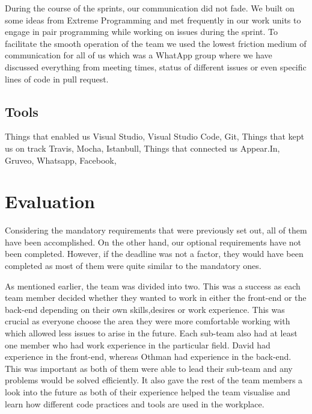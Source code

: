 \documentclass[a4paper]{article}
\begin{document}
	During the course of the sprints, our communication did not fade. We built on some ideas from Extreme Programming and met frequently in our work units to engage in pair programming while working on issues during the sprint. To facilitate the smooth operation of the team we used the lowest friction medium of communication for all of us which was a WhatApp group where we have discussed everything from meeting times, status of different issues or even specific lines of code in pull request. 
	
	\subsection{Tools}
	
	Things that enabled us
	Visual Studio, Visual Studio Code, Git,
	Things that kept us on track
	Travis, Mocha, Istanbull,
	Things that connected us
	Appear.In, Gruveo, Whatsapp, Facebook,
	
	
	\section{Evaluation}
	Considering the mandatory requirements that were previously set out, all of them have been accomplished. %
	On the other hand, our optional requirements have not been completed. However, if the deadline was not a factor, they would have been completed as most of them were quite similar to the mandatory ones. 
	
	As mentioned earlier, the team was divided into two. This was a success as each team member decided whether they wanted to work in either the front-end or the back-end depending on their own skills,desires or work experience. This was crucial as everyone choose the area they were more comfortable working with which allowed less issues to arise in the future. Each sub-team also had at least one member who had work experience in the particular field. David had experience in the front-end, whereas Othman had experience in the back-end. This was important as both of them were able to lead their sub-team and any problems would be solved efficiently. It also gave the rest of the team members a look into the future as both of their experience helped the team visualise and learn how different code practices and tools are used in the workplace.
	
\end{document}
